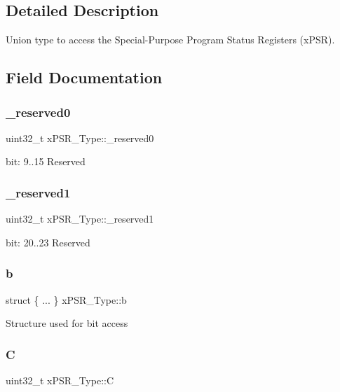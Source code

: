 \subsection{Detailed Description}
Union type to access the Special-\/\+Purpose Program Status Registers (x\+P\+SR). 

\subsection{Field Documentation}
\mbox{\label{unionxPSR__Type_af438e0f407357e914a70b5bd4d6a97c5}} 
\subsubsection{\texorpdfstring{\_reserved0}{\_reserved0}}
{\footnotesize\ttfamily uint32\+\_\+t x\+P\+S\+R\+\_\+\+Type\+::\+\_\+reserved0}

bit\+: 9..15 Reserved \mbox{\label{unionxPSR__Type_a790056bb6f20ea16cecc784b0dd19ad6}} 
\subsubsection{\texorpdfstring{\_reserved1}{\_reserved1}}
{\footnotesize\ttfamily uint32\+\_\+t x\+P\+S\+R\+\_\+\+Type\+::\+\_\+reserved1}

bit\+: 20..23 Reserved \mbox{\label{unionxPSR__Type_adfd25f02d5b867f9075e25f06f2f4d7d}} 
\subsubsection{\texorpdfstring{b}{b}}
{\footnotesize\ttfamily struct \{ ... \}   x\+P\+S\+R\+\_\+\+Type\+::b}

Structure used for bit access \mbox{\label{unionxPSR__Type_a40213a6b5620410cac83b0d89564609d}} 
\subsubsection{\texorpdfstring{C}{C}}
{\footnotesize\ttfamily uint32\+\_\+t x\+P\+S\+R\+\_\+\+Type\+::C}


